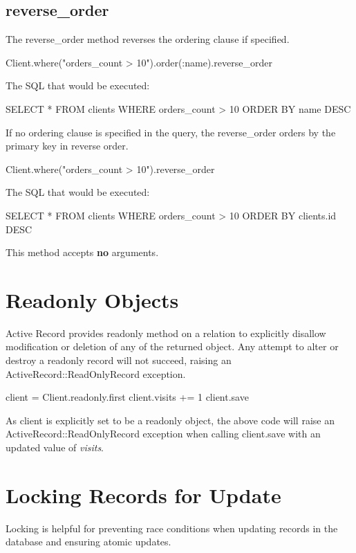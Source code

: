 \documentclass[10pt]{book}
\newenvironment{code}{%
  \scriptsize
    \verbatim
}{%
    \endverbatim
    \newline
}
\begin{document}
\subsection{ reverse\_order}

The reverse\_order method reverses the ordering clause if specified.
\begin{code}
Client.where("orders_count > 10").order(:name).reverse_order
\end{code}

The SQL that would be executed:
\begin{code}
SELECT * FROM clients WHERE orders_count > 10 ORDER BY name DESC
\end{code}

If no ordering clause is specified in the query, the reverse\_order orders by the primary key in reverse order.
\begin{code}
Client.where("orders_count > 10").reverse_order
\end{code}

The SQL that would be executed:
\begin{code}
SELECT * FROM clients WHERE orders_count > 10 ORDER BY clients.id DESC
\end{code}

This method accepts \textbf{no} arguments.

\section{ Readonly Objects}

Active Record provides readonly method on a relation to  explicitly disallow modification or deletion of any of the returned  object. Any attempt to alter or destroy a readonly record will not  succeed, raising an ActiveRecord::ReadOnlyRecord exception.
\begin{code}
client = Client.readonly.first
client.visits += 1
client.save
\end{code}

As client is explicitly set to be a readonly object, the above code will raise an \\ ActiveRecord::ReadOnlyRecord exception when calling client.save with an updated value of \emph{visits}.

\section{ Locking Records for Update}

Locking is helpful for preventing race conditions when updating records in the database and ensuring atomic updates.
\end{document}
